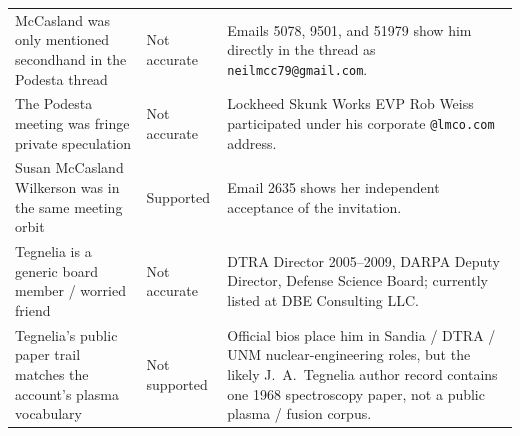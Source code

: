 \documentclass[11pt]{article}
\begin{document}
\begin{longtable}{@{}>{\raggedright\arraybackslash}p{} >{\raggedright\arraybackslash}p{} >{\raggedright\arraybackslash}p{}@{}}
McCasland was only mentioned secondhand in the Podesta thread & Not accurate & Emails 5078, 9501, and 51979 show him directly in the thread as \texttt{neilmcc79@gmail.com}. \\[4pt]
The Podesta meeting was fringe private speculation & Not accurate & Lockheed Skunk Works EVP Rob Weiss participated under his corporate \texttt{@lmco.com} address. \\[4pt]
Susan McCasland Wilkerson was in the same meeting orbit & Supported & Email 2635 shows her independent acceptance of the invitation. \\[4pt]
Tegnelia is a generic board member / worried friend & Not accurate & DTRA Director 2005--2009, DARPA Deputy Director, Defense Science Board; currently listed at DBE Consulting LLC. \\[4pt]
Tegnelia's public paper trail matches the account's plasma vocabulary & Not supported & Official bios place him in Sandia / DTRA / UNM nuclear-engineering roles, but the likely J.\ A.\ Tegnelia author record contains one 1968 spectroscopy paper, not a public plasma / fusion corpus. \\[4pt]


\end{longtable}
\end{document}
